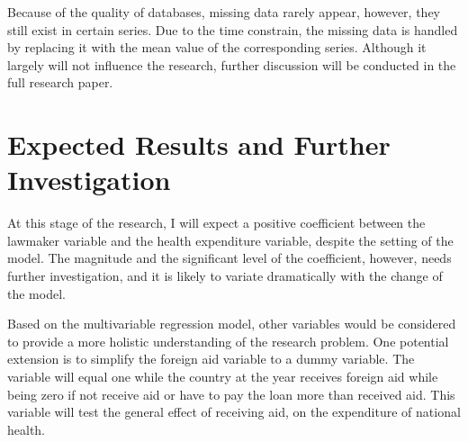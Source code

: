 \documentclass[12pt]{article}
\begin{document}
Because of the quality of databases, missing data rarely appear, however, they still exist in certain series.
Due to the time constrain, the missing data is handled by replacing it with the mean value of the corresponding series. 
Although it largely will not influence the research, further discussion will be conducted in the full research paper.


\section{Expected Results and Further Investigation}
At this stage of the research, I will expect a positive coefficient between the lawmaker variable and the health expenditure variable, despite the setting of the model.
The magnitude and the significant level of the coefficient, however, needs further investigation, and it is likely to variate dramatically with the change of the model.

Based on the multivariable regression model, other variables would be considered to provide a more holistic understanding of the research problem.
One potential extension is to simplify the foreign aid variable to a dummy variable.
The variable will equal one while the country at the year receives foreign aid while being zero if not receive aid or have to pay the loan more than received aid.
This variable will test the general effect of receiving aid, on the expenditure of national health.
\end{document}
